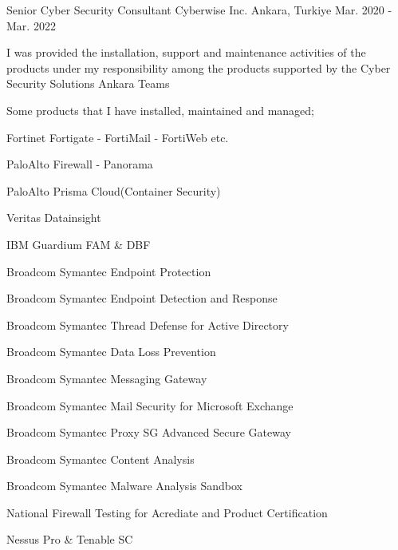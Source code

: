 \begin{cventries}
  \cventry
    {Senior Cyber Security Consultant} %
    {Cyberwise Inc.} %
    {Ankara, Turkiye} %
    {Mar. 2020 - Mar. 2022} %
    {
      \begin{cvitems} %
        \item {I was provided the installation, support and maintenance activities of the products under my responsibility among the products supported by the Cyber Security Solutions Ankara Teams}
        \item {Some products that I have installed, maintained and managed;}
        \item {Fortinet Fortigate - FortiMail - FortiWeb etc.}
        \item {PaloAlto Firewall - Panorama}
        \item {PaloAlto Prisma Cloud(Container Security)}
        \item {Veritas Datainsight}
        \item {IBM Guardium FAM \& DBF}
        \item {Broadcom Symantec Endpoint Protection}
        \item {Broadcom Symantec Endpoint Detection and Response}
        \item {Broadcom Symantec Thread Defense for Active Directory}   
        \item {Broadcom Symantec Data Loss Prevention}
        \item {Broadcom Symantec Messaging Gateway}
        \item {Broadcom Symantec Mail Security for Microsoft Exchange}
        \item {Broadcom Symantec Proxy SG Advanced Secure Gateway}
        \item {Broadcom Symantec Content Analysis}
        \item {Broadcom Symantec Malware Analysis Sandbox}
        \item {National Firewall Testing for Acrediate and Product Certification}
        \item {Nessus Pro & Tenable SC}
        

\end{cvitems}}
\end{cventries}
